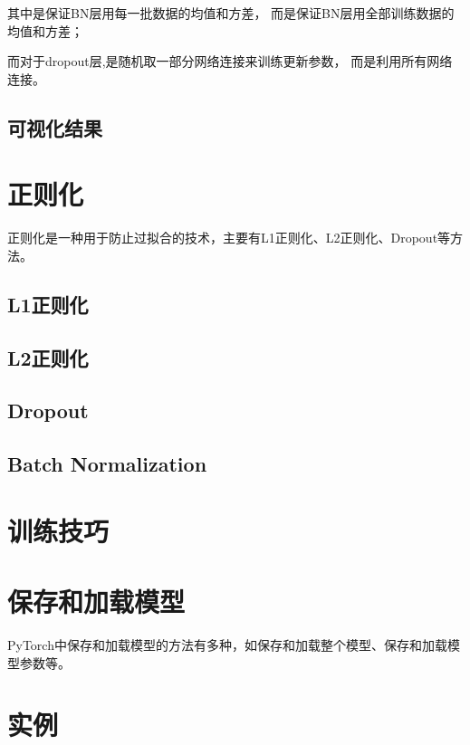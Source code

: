 其中是保证BN层用每一批数据的均值和方差，
而是保证BN层用全部训练数据的均值和方差；

而对于dropout层,是随机取一部分网络连接来训练更新参数，
而是利用所有网络连接。 

\subsection{可视化结果}
\label{subsubsec:Pytorch_visualize_results}

\section{正则化}
\label{subsec:Pytorch_regularization}
正则化是一种用于防止过拟合的技术，主要有L1正则化、L2正则化、Dropout等方法。
\subsection{L1正则化}
\label{subsubsec:Pytorch_L1_regularization}

\subsection{L2正则化}
\label{subsubsec:Pytorch_L2_regularization}

\subsection{Dropout}
\label{subsubsec:Pytorch_dropout}

\subsection{Batch Normalization}
\label{subsubsec:Pytorch_batch_normalization}

\section{训练技巧}
\label{subsec:Pytorch_training_techniques}


\section{保存和加载模型}
\label{subsec:Pytorch_save_and_load_model}
PyTorch中保存和加载模型的方法有多种，如保存和加载整个模型、保存和加载模型参数等。


\section{实例}
\label{subsec:Pytorch_nn_tools_example}
